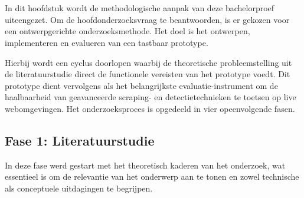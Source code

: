 
\chapter{}%
\label{ch:methodologie}

In dit hoofdstuk wordt de methodologische aanpak van deze bachelorproef uiteengezet. 
Om de hoofdonderzoeksvraag te beantwoorden, is er gekozen voor een ontwerpgerichte onderzoeksmethode. 
Het doel is het ontwerpen, implementeren en evalueren van een tastbaar prototype. 

Hierbij wordt een cyclus doorlopen waarbij de theoretische probleemstelling uit de literatuurstudie direct de functionele vereisten van het prototype voedt. 
Dit prototype dient vervolgens als het belangrijkste evaluatie-instrument om de haalbaarheid van geavanceerde scraping- en detectietechnieken te toetsen op live webomgevingen. 
Het onderzoeksproces is opgedeeld in vier opeenvolgende fasen.

\section{Fase 1: Literatuurstudie}
In deze fase werd gestart met het theoretisch kaderen van het onderzoek, wat essentieel is om de relevantie van het onderwerp aan te tonen en zowel technische als conceptuele uitdagingen te begrijpen. 


